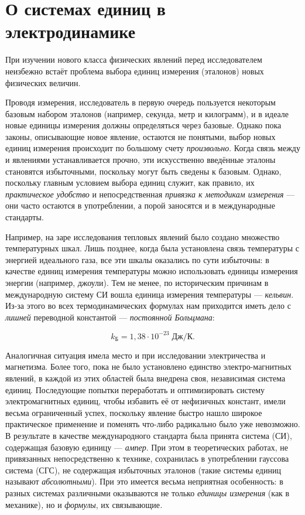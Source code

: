 \section*{О системах единиц в электродинамике}
\label{sec:app_units}

При изучении нового класса физических явлений перед исследователем
неизбежно встаёт проблема выбора единиц измерения (эталонов) новых
физических величин.

Проводя измерения, исследователь в первую очередь пользуется некоторым
базовым набором эталонов (например, секунда, метр и килограмм), и
в идеале новые единицы измерения должны определяться через базовые.
Однако пока законы, описывающие новое явление, остаются не понятыми,
выбор новых единиц измерения происходит по большому счету \emph{произвольно}.
Когда связь между  и 
явлениями устанавливается прочно, эти искусственно введённые эталоны
становятся избыточными, поскольку могут быть сведены к базовым. Однако,
поскольку главным условием выбора 
единиц служит, как правило, их \emph{практическое удобство} и непосредственная
\emph{привязка к методикам измерения} --- они часто остаются в употреблении,
а порой заносятся и в международные стандарты.

Например, на заре исследования тепловых явлений было создано множество
температурных шкал. Лишь позднее, когда была установлена связь температуры
с энергией идеального газа, все эти шкалы оказались по сути избыточны:
в качестве единиц измерения температуры можно использовать единицы
измерения энергии (например, джоули). Тем не менее, по историческим
причинам в международную систему СИ вошла 
единица измерения температуры --- \emph{кельвин}. Из-за этого во
всех термодинамических формулах нам приходится иметь дело с \emph{лишней}
переводной константой --- \emph{постоянной Больцмана}:

\[
k_{\text{Б}}=1{,}38\cdot10^{-23}\;\text{Дж}/\text{К}.
\]

Аналогичная ситуация имела место и при исследовании электричества
и магнетизма. Более того, пока не было установлено единство электро-магнитных
явлений, в каждой из этих областей была внедрена своя, независимая
система единиц. Последующие попытки переработать и оптимизировать
систему электромагнитных единиц, чтобы избавить её от нефизичных \textquote{}
констант, имели весьма ограниченный успех, поскольку явление быстро
нашло широкое практическое применение и поменять что-либо радикально
было уже невозможно. В результате в качестве международного стандарта
была принята система (СИ), содержащая 
базовую единицу --- \emph{ампер}. При этом в теоретических работах,
не привязанных непосредственно к технике, сохранилась в употреблении
гауссова система (СГС), не содержащая избыточных эталонов (такие системы
единиц называют \emph{абсолютными}). При это имеется весьма неприятная
особенность: в разных системах различными оказываются не только \emph{единицы
измерения }(как в механике)\emph{, }но и \emph{формулы}, их связывающие\emph{.} 

